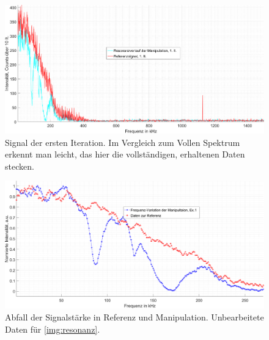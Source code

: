 \documentclass[numbers=noenddot,a4paper,notitlepage,twoside,BCOR15mm]{scrartcl}
\begin{document}
		\begin{figure}
			\includegraphics[width=\textwidth]{pics/erste_it.png}
			\caption{Signal der ersten Iteration. Im Vergleich zum Vollen Spektrum erkennt man leicht, das hier die vollständigen, erhaltenen Daten stecken.}\label{img:1it}
		\end{figure}
		
		\begin{figure}
			\includegraphics[width=\textwidth]{pics/freq_smooth.png}
			\caption{Abfall der Signalstärke in Referenz und Manipulation. Unbearbeitete Daten für \autoref{img:resonanz}.}\label{img:1itsm}
		\end{figure}
		
\end{document}
